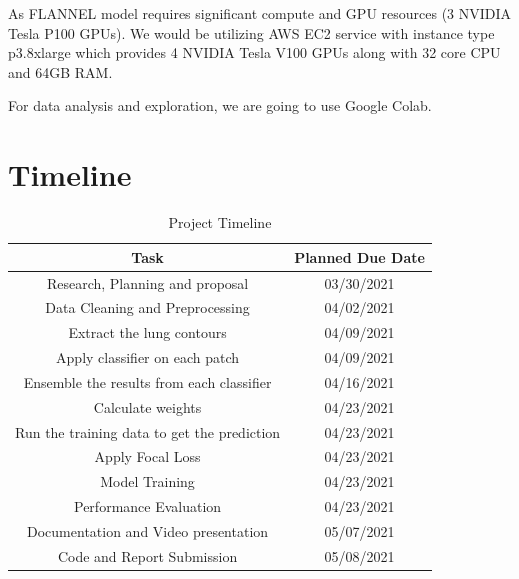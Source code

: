 \documentclass{sigkddExp}
\begin{document}
As FLANNEL model requires significant compute and GPU
resources (3 NVIDIA Tesla P100 GPUs). We would be utilizing AWS EC2 service with
instance type p3.8xlarge which provides 4 NVIDIA Tesla V100 GPUs along with 32
core CPU and 64GB RAM.

For data analysis and exploration, we are going to use Google Colab.


\section{Timeline}


\begin{table}[H]
    \centering
    \caption{Project Timeline}
    \begin{tabular}{|c|c|} \hline
        Task                                        & Planned Due Date \\ \hline
        Research, Planning and proposal             & 03/30/2021       \\ \hline
        Data Cleaning and Preprocessing             & 04/02/2021       \\ \hline
        Extract the lung contours                   & 04/09/2021       \\ \hline
        Apply classifier on each patch              & 04/09/2021       \\ \hline
        Ensemble the results from each classifier   & 04/16/2021       \\ \hline
        Calculate weights                           & 04/23/2021       \\ \hline
        Run the training data to get the prediction & 04/23/2021       \\ \hline
        Apply Focal Loss                            & 04/23/2021       \\ \hline
        Model Training                              & 04/23/2021       \\ \hline
        Performance Evaluation                      & 04/23/2021       \\ \hline
        Documentation and Video presentation        & 05/07/2021       \\ \hline
        Code and Report Submission                  & 05/08/2021       \\
        \hline\end{tabular}
\end{table}



\newpage
%

\end{document}
